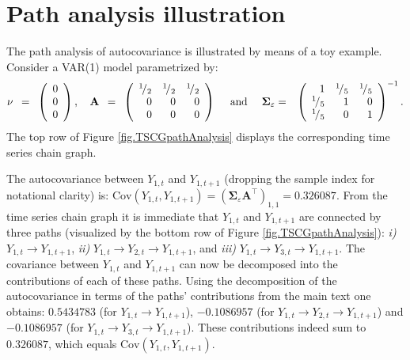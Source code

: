 \section{Path analysis illustration}
The path analysis of autocovariance is illustrated by means of a toy example. Consider a VAR(1) model parametrized by:
\begin{eqnarray*}
\mathbf{\nu} \, \, \, = \, \, \,
\left(
\begin{array}{rrr}
0
\\
0
\\
0
\end{array}
\right),
\quad \mathbf{A} \, \, \, = \, \, \,
\left(
\begin{array}{rrr}
{}^{1}\!/_{2} & {}^{1}\!/_{2} & {}^{1}\!/_{2}
\\
0 & 0 & 0
\\
0 & 0 & 0
\end{array}
\right)
\quad \mbox{ and } \quad
\mathbf{\Sigma}_{\varepsilon} & = &
\left(
\begin{array}{rrr}
1 & {}^{1}\!/_{5} & {}^{1}\!/_{5}
\\
{}^{1}\!/_{5} & 1 & 0
\\
{}^{1}\!/_{5} & 0 & 1
\end{array}
\right)^{-1}.
\end{eqnarray*}
The top row of Figure \ref{fig.TSCGpathAnalysis} displays the corresponding time series chain graph.

The autocovariance between $Y_{1,t}$ and $Y_{1,t+1}$ (dropping the sample index for notational clarity) is: $\mbox{Cov}(Y_{1,t}, Y_{1,t+1}) = (\mathbf{\Sigma}_{\varepsilon} \mathbf{A}^{\top})_{1,1} = 0.326087$. From the time series chain graph it is immediate that $Y_{1,t}$ and $Y_{1,t+1}$  are connected by three paths (visualized by the bottom row of Figure \ref{fig.TSCGpathAnalysis}): \textit{i)} $Y_{1,t} \rightarrow Y_{1,t+1}$, \textit{ii)} $Y_{1,t} \rightarrow Y_{2,t} \rightarrow Y_{1,t+1}$, and \textit{iii)} $Y_{1,t} \rightarrow Y_{3,t} \rightarrow Y_{1,t+1}$. The	 covariance between $Y_{1,t}$ and $Y_{1,t+1}$ can now be decomposed into the contributions of each of these paths. Using the decomposition of the autocovariance in terms of the paths' contributions from the main text one obtains: $0.5434783$ (for $Y_{1,t} \rightarrow Y_{1,t+1}$), $-0.1086957$ (for $Y_{1,t} \rightarrow Y_{2,t} \rightarrow Y_{1,t+1}$) and $-0.1086957$ (for $Y_{1,t} \rightarrow Y_{3,t} \rightarrow Y_{1,t+1}$). These contributions indeed sum to $0.326087$, which equals $\mbox{Cov}(Y_{1,t}, Y_{1,t+1})$.

